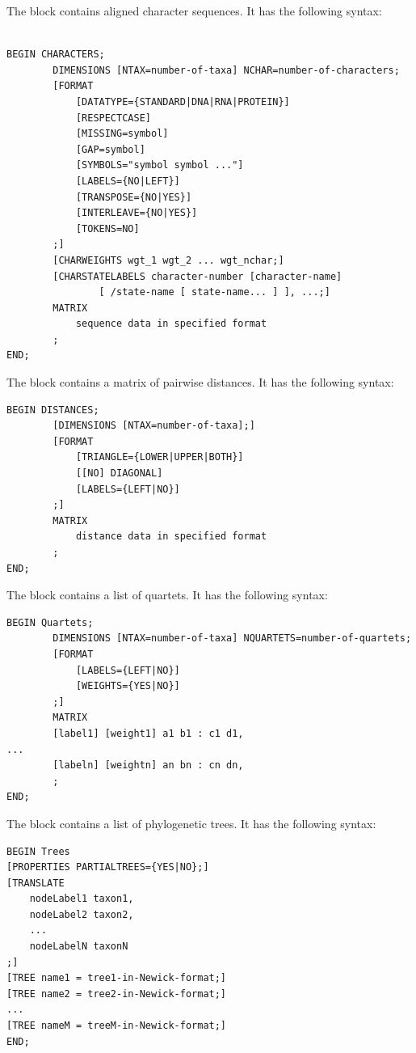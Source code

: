 \documentclass[11pt]{article}
\begin{document}

The  block contains aligned character sequences.
It has the following syntax:
\begin{verbatim}

BEGIN CHARACTERS;
        DIMENSIONS [NTAX=number-of-taxa] NCHAR=number-of-characters;
        [FORMAT
            [DATATYPE={STANDARD|DNA|RNA|PROTEIN}]
            [RESPECTCASE]
            [MISSING=symbol]
            [GAP=symbol]
            [SYMBOLS="symbol symbol ..."]
            [LABELS={NO|LEFT}]
            [TRANSPOSE={NO|YES}]
            [INTERLEAVE={NO|YES}]
            [TOKENS=NO]
        ;]
        [CHARWEIGHTS wgt_1 wgt_2 ... wgt_nchar;]
        [CHARSTATELABELS character-number [character-name]
                [ /state-name [ state-name... ] ], ...;]
        MATRIX
            sequence data in specified format
        ;
END;
\end{verbatim}


The  block contains a matrix of pairwise distances.
It has the following syntax:
\begin{verbatim}
BEGIN DISTANCES;
        [DIMENSIONS [NTAX=number-of-taxa];]
        [FORMAT
            [TRIANGLE={LOWER|UPPER|BOTH}]
            [[NO] DIAGONAL]
            [LABELS={LEFT|NO}]
        ;]
        MATRIX
            distance data in specified format
        ;
END;
\end{verbatim}


The  block contains a list of quartets.
It has the following syntax:

\begin{verbatim}
BEGIN Quartets;
        DIMENSIONS [NTAX=number-of-taxa] NQUARTETS=number-of-quartets;
        [FORMAT
            [LABELS={LEFT|NO}]
            [WEIGHTS={YES|NO}]
        ;]
        MATRIX
        [label1] [weight1] a1 b1 : c1 d1,
...
        [labeln] [weightn] an bn : cn dn,
        ;
END;
\end{verbatim}


The  block contains a list of phylogenetic trees.
It has the following syntax:
\begin{verbatim}
BEGIN Trees
[PROPERTIES PARTIALTREES={YES|NO};]
[TRANSLATE
    nodeLabel1 taxon1,
    nodeLabel2 taxon2,
    ...
    nodeLabelN taxonN
;]
[TREE name1 = tree1-in-Newick-format;]
[TREE name2 = tree2-in-Newick-format;]
...
[TREE nameM = treeM-in-Newick-format;]
END;
\end{verbatim}
\end{document}

